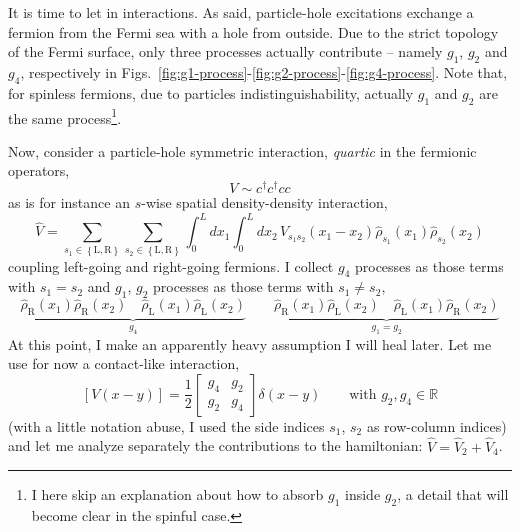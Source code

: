 It is time to let in interactions. As said, particle-hole excitations exchange a fermion from the Fermi sea with a hole from outside. Due to the strict topology of the Fermi surface, only three processes actually contribute -- namely $g_1$, $g_2$ and $g_4$, respectively in Figs.~\ref{fig:g1-process}-\ref{fig:g2-process}-\ref{fig:g4-process}. Note that, for spinless fermions, due to particles indistinguishability, actually $g_1$ and $g_2$ are the same process\footnote{
	I here skip an explanation about how to absorb $g_1$ inside $g_2$, a detail that will become clear in the spinful case.
}.

Now, consider a particle-hole symmetric interaction, \textit{quartic} in the fermionic operators,
\[
	V \sim c^\dagger c^\dagger c c
\]
as is for instance an $s$-wise spatial density-density interaction,
\[
	\hat V = \sum_{s_1 \in \left\{\mathrm L, \mathrm R\right\}} \sum_{s_2 \in \left\{\mathrm L, \mathrm R\right\}} \int_0^L dx_1 \int_0^L dx_2 \, V_{s_1 s_2}(x_1-x_2) \hat \rho_{s_1}(x_1) \hat \rho_{s_2} (x_2)
\]
coupling left-going and right-going fermions. I collect $g_4$ processes as those terms with $s_1 = s_2$ and $g_1$, $g_2$ processes as those terms with $s_1 \neq s_2$,
\[
	\underbrace{\hat \rho_\mathrm{R} (x_1) \hat \rho_\mathrm{R} (x_2) \quad \hat \rho_\mathrm{L} (x_1) \hat \rho_\mathrm{L} (x_2)}_{g_4} \qquad \underbrace{\hat \rho_\mathrm{R} (x_1) \hat \rho_\mathrm{L} (x_2) \quad \hat \rho_\mathrm{L} (x_1) \hat \rho_\mathrm{R} (x_2)}_{g_1 = g_2}
\]
At this point, I make an apparently heavy assumption I will heal later. Let me use for now a contact-like interaction,
\[
	\left[V(x-y)\right] = \frac{1}{2} \begin{bmatrix}
		g_4 & g_2 \\ g_2 & g_4
	\end{bmatrix} \delta(x-y)
	\qquad
	\text{with $g_2, g_4 \in \mathbb{R}$}
\]
(with a little notation abuse, I used the side indices $s_1$, $s_2$ as row-column indices) and let me analyze separately the contributions to the hamiltonian: $\hat V = \hat V_2 + \hat V_4$.

